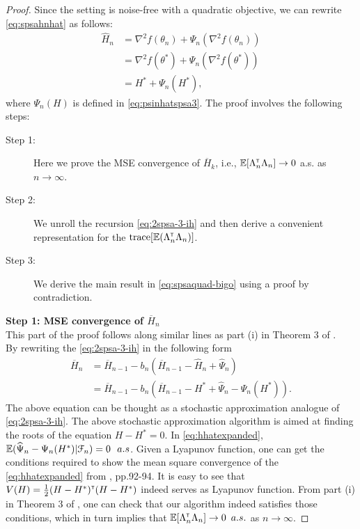 \begin{proof}
Since the setting is noise-free with a quadratic objective, we can rewrite \eqref{eq:spsahnhat} as follows:
\begin{align}
 \widehat H_n &=    \nabla^2 f(\theta_n) +\Psi_{n}(\nabla^2 f(\theta_n))\nonumber\\
 &=    \nabla^2 f(\theta^*) +\Psi_{n}(\nabla^2 f(\theta^*))\nonumber\\
 &=    H^* +\Psi_{n}(H^* ),\label{eq:spsahnhat-ext}
\end{align}
where $\Psi_n(H)$ is defined in \eqref{eq:psinhatspsa3}.
The proof involves the following steps:
\begin{description}
  \item[Step 1:] Here we prove the MSE convergence of $\overline H_k$, i.e., $\mathbb{E} [\Lambda_n^\mathsf{\scriptscriptstyle T} \Lambda_n] \rightarrow 0$ a.s. as $n\rightarrow \infty$.
  \item[Step 2:] We unroll the recursion \eqref{eq:2spsa-3-ih} and then derive a convenient representation for the  $\text{trace}[\mathbb{E} (\Lambda_n ^\mathsf{\scriptscriptstyle T} \Lambda_n)]$.
  \item[Step 3:] We derive the main result in \eqref{eq:spsaquad-bigo} using a proof by contradiction. 
\end{description}
\noindent\textbf{Step 1: MSE convergence of $\overline H_n$} \\
This part of the proof follows along similar lines as  part (i) in Theorem 3 of \cite{spall-jacobian}.\\
By rewriting the \eqref{eq:2spsa-3-ih} in the following form
\begin{align}\label{eq:hhatexpanded}
\overline H_{n} &= \overline H_{n-1} - b_{n} ( \overline H_{n-1} - \widehat H_n + \widehat \Psi_n)\nonumber\\
&= \overline H_{n-1} - b_{n} ( \overline H_{n-1} - H^* + \widehat \Psi_n - \Psi_n (H^*)).
\end{align}
The above equation can be thought as a stochastic approximation analogue of \eqref{eq:2spsa-3-ih}. The above stochastic approximation algorithm is aimed at finding the roots of the equation $H-H^*=0$. In \eqref{eq:hhatexpanded}, $\mathbb{E} (\widehat \Psi_n - \Psi_n (H^*) | \mathcal{F}_n) = 0 \,\,\ a.s$.  Given a Lyapunov function, one can  get the conditions required to show  the mean square convergence of the \eqref{eq:hhatexpanded} from \cite{nevel1973stochastic}, pp.92-94. It is easy to see that $V(H) = \frac{1}{2} (H-H^*)^\mathsf{\scriptscriptstyle T}(H-H^*)$ indeed serves as Lyapunov function. From part (i) in Theorem 3 of \cite{spall-jacobian}, one can check that our algorithm indeed satisfies those conditions,  which in turn implies that $\mathbb{E} [\Lambda_n^\mathsf{\scriptscriptstyle T} \Lambda_n] \rightarrow 0 \,\,\,a.s.$ as $n\rightarrow \infty$. 



\end{proof}
